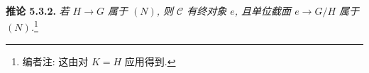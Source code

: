 \medskip
\noindent{}\textbf{推论 5.3.2.}
\textit{若 \(H\to G\) 属于 \((N)\), 则 \(\mathscr C\) 有终对象 \(e\),
且单位截面 \(e\to G/H\) 属于 \((N)\).}\footnote{编者注: 这由对 \(K=H\) 应用得到.}

